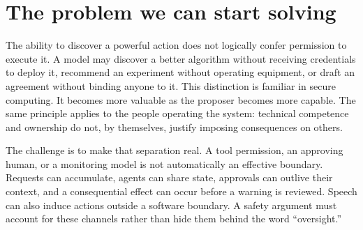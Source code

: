 \documentclass[10pt,twocolumn,letterpaper]{article}
\begin{document}
\section{The problem we can start solving}

The ability to discover a powerful action does not logically confer permission to execute it. A model may discover a better algorithm without receiving credentials to deploy it, recommend an experiment without operating equipment, or draft an agreement without binding anyone to it. This distinction is familiar in secure computing. It becomes more valuable as the proposer becomes more capable. The same principle applies to the people operating the system: technical competence and ownership do not, by themselves, justify imposing consequences on others.

The challenge is to make that separation real. A tool permission, an approving human, or a monitoring model is not automatically an effective boundary. Requests can accumulate, agents can share state, approvals can outlive their context, and a consequential effect can occur before a warning is reviewed. Speech can also induce actions outside a software boundary. A safety argument must account for these channels rather than hide them behind the word ``oversight.''
\end{document}
